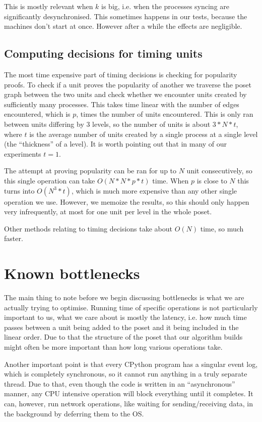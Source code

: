 \documentclass[a4paper,10pt]{article}
\begin{document}
			This is mostly relevant when $k$ is big, i.e. when the processes syncing are significantly desynchronised.
			This sometimes happens in our tests, because the machines don't start at once.
			However after a while the effects are negligible.
		\subsection{Computing decisions for timing units}
		 The most time expensive part of timing decisions is checking for popularity proofs.
			To check if a unit proves the popularity of another we traverse the poset graph between the two units and check whether
			we encounter units created by sufficiently many processes. This takes time linear with the number of edges encountered,
			which is $p$, times the number of units encountered. This is only ran between units differing by $3$ levels, so the number of units
			is about $3*N*t$, where $t$ is the average number of units created by a single process at a single level (the ``thickness'' of a level).
			It is worth pointing out that in many of our experiments	$t = 1$.

			The attempt at proving popularity can be ran for up to $N$ unit consecutively, so this single operation can take $O(N*N*p*t)$ time.
			When $p$ is close to $N$ this turns into $O(N^3*t)$, which is much more expensive than any other single operation we use.
			However, we memoize the results, so this should only happen very infrequently, at most for one unit per level in the whole poset.

			Other methods relating to timing decisions take about $O(N)$ time, so much faster.
	\section{Known bottlenecks}
		The main thing to note before we begin discussing bottlenecks is what we are actually trying to optimise.
		Running time of specific operations is not particularly important to us, what we care about is mostly the latency,
		i.e. how much time passes between a unit being added to the poset and it being included in the linear order.
		Due to that the structure of the poset that our algorithm builds might often be more important than how long various operations take.

		Another important point is that every CPython program has a singular event log, which is completely synchronous, so it cannot run anything in a truly separate thread.
		Due to that, even though the code is written in an ``asynchronous'' manner, any CPU intensive operation will block everything until it completes.
		It can, however, run network operations, like waiting for sending/receiving data, in the background by deferring them to the OS.
\end{document}
